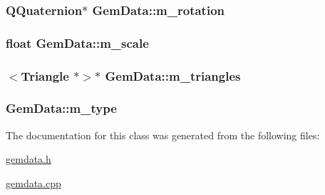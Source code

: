 \hypertarget{class_gem_data_a8a055b766496fa47842a683035f15637}{
\subsubsection[{m\+\_\+rotation}]{\setlength{\rightskip}{0pt plus 5cm}Q\+Quaternion$\ast$ Gem\+Data\+::m\+\_\+rotation\hspace{0.3cm}{\ttfamily [protected]}}}\label{class_gem_data_a8a055b766496fa47842a683035f15637}
\hypertarget{class_gem_data_a15953642fe15a2a37aceea037e4ad81e}{
\subsubsection[{m\+\_\+scale}]{\setlength{\rightskip}{0pt plus 5cm}float Gem\+Data\+::m\+\_\+scale\hspace{0.3cm}{\ttfamily [protected]}}}\label{class_gem_data_a15953642fe15a2a37aceea037e4ad81e}
\hypertarget{class_gem_data_a21068b04db70d2e37e9c30d816484f25}{
\subsubsection[{m\+\_\+triangles}]{$<${\bf Triangle} $\ast$$>$$\ast$ Gem\+Data\+::m\+\_\+triangles\hspace{0.3cm}{\ttfamily [protected]}}}\label{class_gem_data_a21068b04db70d2e37e9c30d816484f25}
\hypertarget{class_gem_data_a310940114f54b2146f6601662e8a323f}{
\subsubsection[{m\+\_\+type}]{ Gem\+Data\+::m\+\_\+type\hspace{0.3cm}{\ttfamily [protected]}}}\label{class_gem_data_a310940114f54b2146f6601662e8a323f}


The documentation for this class was generated from the following files\+:\begin{DoxyCompactItemize}
\item 
\hyperlink{gemdata_8h}{gemdata.\+h}\item 
\hyperlink{gemdata_8cpp}{gemdata.\+cpp}\end{DoxyCompactItemize}
